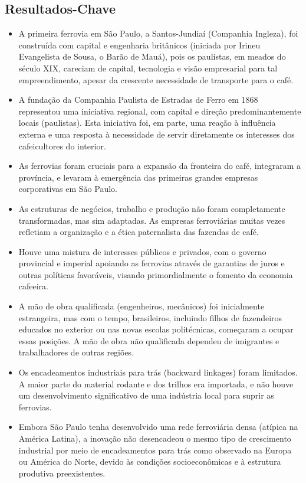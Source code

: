 \documentclass[12pt]{article}
\begin{document}
\subsection*{Resultados-Chave}
\begin{itemize}
    \item A primeira ferrovia em São Paulo, a Santos-Jundiaí (Companhia Ingleza), foi construída com capital e engenharia britânicos (iniciada por Irineu Evangelista de Sousa, o Barão de Mauá), pois os paulistas, em meados do século XIX, careciam de capital, tecnologia e visão empresarial para tal empreendimento, apesar da crescente necessidade de transporte para o café.
    \item A fundação da Companhia Paulista de Estradas de Ferro em 1868 representou uma iniciativa regional, com capital e direção predominantemente locais (paulistas). Esta iniciativa foi, em parte, uma reação à influência externa e uma resposta à necessidade de servir diretamente os interesses dos cafeicultores do interior.
    \item As ferrovias foram cruciais para a expansão da fronteira do café, integraram a província, e levaram à emergência das primeiras grandes empresas corporativas em São Paulo.
    \item As estruturas de negócios, trabalho e produção não foram completamente transformadas, mas sim adaptadas. As empresas ferroviárias muitas vezes refletiam a organização e a ética paternalista das fazendas de café.
    \item Houve uma mistura de interesses públicos e privados, com o governo provincial e imperial apoiando as ferrovias através de garantias de juros e outras políticas favoráveis, visando primordialmente o fomento da economia cafeeira.
    \item A mão de obra qualificada (engenheiros, mecânicos) foi inicialmente estrangeira, mas com o tempo, brasileiros, incluindo filhos de fazendeiros educados no exterior ou nas novas escolas politécnicas, começaram a ocupar essas posições. A mão de obra não qualificada dependeu de imigrantes e trabalhadores de outras regiões.
    \item Os encadeamentos industriais para trás (backward linkages) foram limitados. A maior parte do material rodante e dos trilhos era importada, e não houve um desenvolvimento significativo de uma indústria local para suprir as ferrovias.
    \item Embora São Paulo tenha desenvolvido uma rede ferroviária densa (atípica na América Latina), a inovação não desencadeou o mesmo tipo de crescimento industrial por meio de encadeamentos para trás como observado na Europa ou América do Norte, devido às condições socioeconômicas e à estrutura produtiva preexistentes.
\end{itemize}
\end{document}
